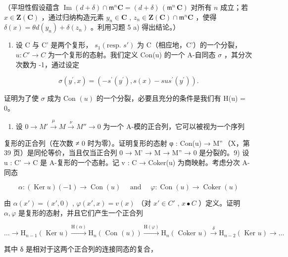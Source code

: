 （平坦性假设蕴含 \(\operatorname{Im}(d + \delta) \cap \mathfrak{m}^n\mathbf{C} = (d + \delta)\, (\mathfrak{m}^n\,\mathbf{C})\) 对所有 \(n\) 成立；若 \(x \in \mathbf{Z}(\mathbf{C})\) ，通过归纳构造元素 \(y_n \in \mathbf{C}\) , \(z_n \in \mathbf{Z}(\mathbf{C}) \cap \mathfrak{m}^n\mathbf{C}\) ，使得 \(\delta(x) = \theta d(y_n) + \delta(z_n)\) 。利用习题 5 a) 得出结论。）

\begin{enumerate}
\def\labelenumi{\arabic{enumi})}
\setcounter{enumi}{6}
\tightlist
\item
  设 C 与 C' 是两个复形， \(s_{1}(\text{resp. } s')\) 为 C（相应地，C'）的一个分裂， \(u : C' \to C\) 为一个复形的态射。我们定义 Con(u) 的一个 A-自同态 \(\sigma\) ，其分次次数为 -1，通过设定
\end{enumerate}

\[
\sigma (y ^ {\prime}, x) = \left(- s ^ {\prime} (y ^ {\prime}), s (x) - s u s ^ {\prime} (y ^ {\prime})\right).
\]

证明为了使 \(\sigma\) 成为 Con \((u)\) 的一个分裂，必要且充分的条件是我们有 H(u) = 0。

\begin{enumerate}
\def\labelenumi{\arabic{enumi})}
\setcounter{enumi}{7}
\tightlist
\item
  设 \(0 \to M' \xrightarrow{\mu} M \xrightarrow{\nu} M'' \to 0\) 为一个 A-模的正合列，它可以被视为一个序列
\end{enumerate}

复形的正合列（在次数 ≠ 0 时为零）。证明复形的态射 φ : Con(u) → M''\,（X，第 39 页）是同伦等价，当且仅当正合列 0 → M' → M → M'' → 0 是分裂的。9) 设 u : C' → C 是 A-复形的一个态射。记 v : C → Coker(u) 为商映射。考虑分次 A-同态

\[
\alpha : (\operatorname{Ker} u) (- 1) \rightarrow \operatorname{Con} (u) \quad \text { and } \quad \varphi : \operatorname{Con} (u) \rightarrow \operatorname{Coker} (u)
\]

由 \(\alpha(x') = (x', 0)\) , \(\varphi(x', x) = v(x)\) （对 \(x' \in C'\) , \(x \bullet C\) ）定义。证明 \(\alpha, \varphi\) 是复形的态射，并且它们产生一个正合列

\[
\dots \rightarrow \mathrm{H} _ {n - 1} (\text { Ker } u) \xrightarrow {\mathrm{H} (\alpha)} \mathrm{H} _ {n} (\text { Con } (u)) \xrightarrow {\mathrm{H} (\varphi)} \mathrm{H} _ {n} (\text { Coker } u) \xrightarrow {\delta} \mathrm{H} _ {n - 2} (\text { Ker } u) \rightarrow \dots
\]

其中 δ 是相对于这两个正合列的连接同态的复合，

